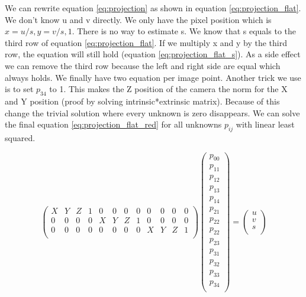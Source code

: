\documentclass[11pt,a4paper,titlepage,oneside]{report}
\begin{document}
We can rewrite equation \ref{eq:projection} as shown in equation \ref{eq:projection_flat}. We don't know u and v directly. We only have the pixel position which is $x=u/s, y=v/s, 1$. There is no way to estimate s. We know that s equals to the third row of equation \ref{eq:projection_flat}. If we multiply x and y by the third row, the equation will still hold (equation \ref{eq:projection_flat_s}). As a side effect we can remove the third row because the left and right side are equal which always holds. We finally have two equation per image point. Another trick we use is to set $p_{34}$ to 1. This makes the Z position of the camera the norm for the X and Y position (proof by solving intrinsic*extrinsic matrix). Because of this change the trivial solution where every unknown is zero disappears. We can solve the final equation \ref{eq:projection_flat_red} for all unknowns $p_{ij}$ with linear least squared.

\setcounter{MaxMatrixCols}{15}
\begin{equation}\label{eq:projection_flat}
	\begin{pmatrix}
		X & Y & Z & 1 & 0 & 0 & 0 & 0 & 0 & 0 & 0 & 0\\
		0 & 0 & 0 & 0 & X & Y & Z & 1 & 0 & 0 & 0 & 0\\
		0 & 0 & 0 & 0 & 0 & 0 & 0 & 0 & X & Y & Z & 1\\
	\end{pmatrix}
	\begin{pmatrix}p_{00}\\
		p_{11}\\
		p_{12}\\
		p_{13}\\
		p_{14}\\
		p_{21}\\
		p_{22}\\
		p_{22}\\
		p_{23}\\
		p_{31}\\
		p_{32}\\
		p_{33}\\
		p_{34} \\
	\end{pmatrix}=
	\begin{pmatrix}u\\
		v\\
		s\\
	\end{pmatrix}
\end{equation}
\end{document}

